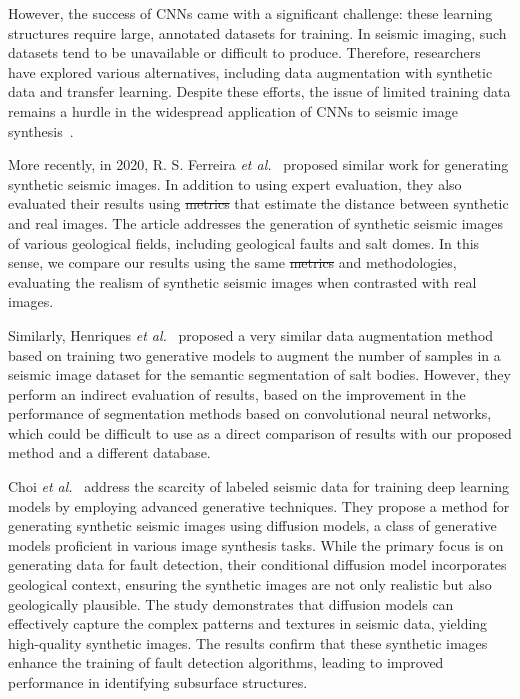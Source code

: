 \documentclass{ieeeaccess}
\makeatletter
\providecommand{\DIFaddtex}[1]{{\protect\color{blue}\uwave{#1}}} %
\providecommand{\DIFdeltex}[1]{{\protect\color{red}\sout{#1}}} %
\providecommand{\DIFaddbegin}{} %
\providecommand{\DIFaddend}{} %
\providecommand{\DIFdelbegin}{} %
\providecommand{\DIFdelend}{} %
\providecommand{\DIFadd}[1]{\texorpdfstring{\DIFaddtex{#1}}{#1}} %
\providecommand{\DIFdel}[1]{\texorpdfstring{\DIFdeltex{#1}}{}} %
\newcommand{\DIFscaledelfig}{0.5}
\newlength{\DIFdelgraphicswidth} %
\newlength{\DIFdelgraphicsheight} %
\newcommand{\DIFaddincludegraphics}[2][]{{\color{blue}\fbox{\DIFOincludegraphics[#1]{#2}}}} %
\newcommand{\DIFdelincludegraphics}[2][]{%
\sbox{\DIFdelgraphicsbox}{\DIFOincludegraphics[#1]{#2}}%
\settoboxwidth{\DIFdelgraphicswidth}{\DIFdelgraphicsbox} %
\settoboxtotalheight{\DIFdelgraphicsheight}{\DIFdelgraphicsbox} %
\scalebox{\DIFscaledelfig}{%
\parbox[b]{\DIFdelgraphicswidth}{\usebox{\DIFdelgraphicsbox}\\[-\baselineskip] \rule{\DIFdelgraphicswidth}{0em}}\llap{\resizebox{\DIFdelgraphicswidth}{\DIFdelgraphicsheight}{%
\setlength{\unitlength}{\DIFdelgraphicswidth}%
\begin{picture}(1,1)%
\thicklines\linethickness{2pt} %
{\color[rgb]{1,0,0}\put(0,0){\framebox(1,1){}}}%
{\color[rgb]{1,0,0}\put(0,0){\line( 1,1){1}}}%
{\color[rgb]{1,0,0}\put(0,1){\line(1,-1){1}}}%
\end{picture}%
}\hspace*{3pt}}} %
} %
\DeclareRobustCommand{\DIFaddbegin}{\DIFOaddbegin \let\includegraphics\DIFaddincludegraphics} %
\DeclareRobustCommand{\DIFaddend}{\DIFOaddend \let\includegraphics\DIFOincludegraphics} %
\DeclareRobustCommand{\DIFdelbegin}{\DIFOdelbegin \let\includegraphics\DIFdelincludegraphics} %
\DeclareRobustCommand{\DIFdelend}{\DIFOaddend \let\includegraphics\DIFOincludegraphics} %
\let\sout@orig\sout %
\renewcommand{\sout}[1]{\ifmmode\text{\sout@orig{\ensuremath{#1}}}\else\sout@orig{#1}\fi} %
\makeatother
\begin{document}
However, the success of CNNs came with a significant challenge: these learning structures require large, annotated datasets for training. In seismic imaging, such datasets tend to be unavailable or difficult to produce. Therefore, researchers have explored various alternatives, including data augmentation with synthetic data and transfer learning. Despite these efforts, the issue of limited training data remains a hurdle in the widespread application of CNNs to seismic image synthesis~\cite{Wang2021}.

More recently, in 2020, R. S. Ferreira \emph{et al.}~\cite{Ferreira2020} proposed similar work for generating synthetic seismic images. In addition to using expert evaluation, they also evaluated their results using \DIFdelbegin \DIFdel{metrics }\DIFdelend \DIFaddbegin \DIFadd{measures }\DIFaddend that estimate the distance between synthetic and real images. The article addresses the generation of synthetic seismic images of various geological fields, including geological faults and salt domes. In this sense, we compare our results using the same \DIFdelbegin \DIFdel{metrics }\DIFdelend \DIFaddbegin \DIFadd{measures }\DIFaddend and methodologies, evaluating the realism of synthetic seismic images when contrasted with real images.

Similarly, Henriques \emph{et al.}~\cite{Henriques2021} proposed a very similar data augmentation method based on training two generative models to augment the number of samples in a seismic image dataset for the semantic segmentation of salt bodies. However, they perform an indirect evaluation of results, based on the improvement in the performance of segmentation methods based on convolutional neural networks, which could be difficult to use as a direct comparison of results with our proposed method and a different database.

Choi \emph{et al.}~\cite{Choi2025} address the scarcity of labeled seismic data for training deep learning models by employing advanced generative techniques. They propose a method for generating synthetic seismic images using diffusion models, a class of generative models proficient in various image synthesis tasks. While the primary focus is on generating data for fault detection, their conditional diffusion model incorporates geological context, ensuring the synthetic images are not only realistic but also geologically plausible. The study demonstrates that diffusion models can effectively capture the complex patterns and textures in seismic data, yielding high-quality synthetic images. The results confirm that these synthetic images enhance the training of fault detection algorithms, leading to improved performance in identifying subsurface structures.
\end{document}
